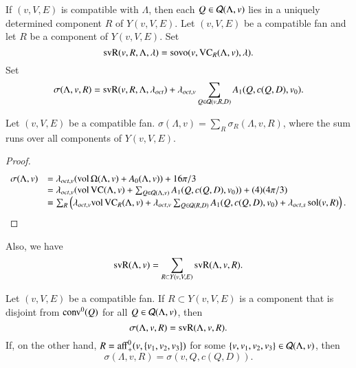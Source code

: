 \begin{definition} 
If $(v,V,E)$ is compatible with $\Lambda$, then each $Q\in{\mathcal Q}(\Lambda,v)$
lies in a uniquely determined component $R$ of $Y(v,V,E)$.
Let $(v,V,E)$ be a compatible fan and let $R$ be a
component of $Y(v,V,E)$.  Set
      $$
      {\operatorname{svR}}(v,R,\Lambda,\lambda) =
      {\operatorname{sovo}}(v,{\operatorname{VC}}_R(\Lambda,v),\lambda).
      $$
Set
      $$
      \sigma(\Lambda,v,R) = {\operatorname{svR}}(v,R,\Lambda,\lambda_{oct}) 
      + \lambda_{oct,v}
         \sum_{Q\in{\mathcal Q}(v,R,D)} A_1(Q,c(Q,D),v_0).
      $$
 
\end{definition}

\begin{lemma}
Let $(v,V,E)$ be a compatible fan.
$\sigma(\Lambda,v) = \sum_R\sigma_R(\Lambda,v,R)$, where the sum runs
over all components of $Y(v,V,E)$.
\end{lemma}

\begin{proof}
   $$
   \begin{array}{lll}
      \sigma(\Lambda,v)
      &= \lambda_{oct,v} ({\operatorname{vol}}\,\Omega(\Lambda,v) + A_0(\Lambda,v))+16\pi/3\\
      &= \lambda_{oct,v} ({\operatorname{vol}}\,{\operatorname{VC}}(\Lambda,v)+\sum_{Q\in{\mathcal Q}(\Lambda,v)}
         A_1(Q,c(Q,D),v_0)) + (4) (4\pi/3)\\
      &= \sum_R \left (\lambda_{oct,v} {\operatorname{vol}}\,{\operatorname{VC}}_R(\Lambda,v) 
         +\lambda_{oct,v}
         \sum_{Q\in{\mathcal Q}(R,D)} A_1(Q,c(Q,D),v_0) +
         \lambda_{oct,s}\operatorname{sol}(v,R)\right).
   \end{array}
   $$
\end{proof}

Also, we have
    \begin{equation}
    \op{svR}(\Lambda,v)=\sum_{R\subset Y(v,V,E)}
    \op{svR}(\Lambda,v,R).
    \tlabel{eqn:vorD}
    \end{equation}

\begin{lemma}
Let $(v,V,E)$ be a compatible fan.  If $R\subset Y(v,V,E)$
is a component that is disjoint from ${\operatorname{conv}}^0(Q)$ for all 
$Q\in{\mathcal Q}(\Lambda,v)$, then
   $$
   \sigma(\Lambda,v,R) = {\operatorname{svR}}(\Lambda,v,R).
   $$
If, on the other hand, $R = {\operatorname{aff}}_+^0(v,\{v_1,v_2,v_3\})$ for
some $\{v,v_1,v_2,v_3\}\in{\mathcal Q}(\Lambda,v)$, then
   $$  
   \sigma(\Lambda,v,R) =  \sigma(v,Q,c(Q,D)).
   $$
\end{lemma}

